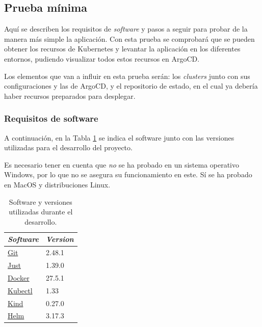 \subsection*{Prueba mínima}

Aquí se describen los requisitos de \textit{software} y pasos a seguir para probar de la manera más simple la aplicación. Con esta prueba se comprobará que se pueden obtener los recursos de Kubernetes y levantar la aplicación en los diferentes entornos, pudiendo visualizar todos estos recursos en ArgoCD.

Los elementos que van a influir en esta prueba serán: los \textit{clusters} junto con sus configuraciones y las de ArgoCD, y el repositorio de estado, en el cual ya debería haber recursos preparados para desplegar.

\subsubsection*{Requisitos de software}

A continuación, en la Tabla \ref{table:software} se indica el software junto con las versiones utilizadas para el desarrollo del proyecto.

Es necesario tener en cuenta que \textit{no} se ha probado en un sistema operativo Windows, por lo que no se asegura su funcionamiento en este. Sí se ha probado en MacOS y distribuciones Linux.

\begin{table}[ht]
  \centering
  \begin{tabular}{|l|l|}
    \hline
    \textit{Software} & \textit{Version} \\ \hline
    \href{https://git-scm.com/book/en/v2/Getting-Started-Installing-Git}{Git} & 2.48.1 \\ \hline
    \href{https://github.com/casey/just?tab=readme-ov-file#installation}{Just} & 1.39.0 \\ \hline
    \href{https://docs.docker.com/desktop/}{Docker} & 27.5.1 \\ \hline
    \href{https://kubernetes.io/docs/tasks/tools/#kubectl}{Kubectl} & 1.33 \\ \hline
    \href{https://kubernetes.io/docs/tasks/tools/#kind}{Kind} & 0.27.0 \\ \hline
    \href{https://helm.sh/docs/intro/install/}{Helm} & 3.17.3 \\ \hline
  \end{tabular}
  \caption{Software y versiones utilizadas durante el desarrollo.}
  \label{table:software}
\end{table}

